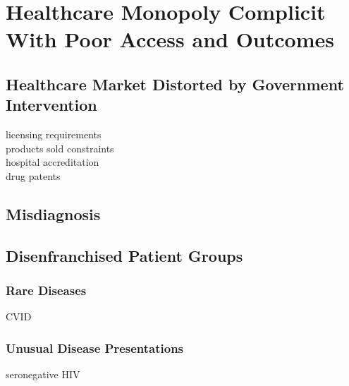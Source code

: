 \documentclass{article}
\begin{document}


\section{Healthcare Monopoly Complicit With Poor Access and Outcomes}

\subsection{Healthcare Market Distorted by Government Intervention}

licensing requirements\\
products sold constraints\\
hospital accreditation\\
drug patents

\subsection{Misdiagnosis}
\cite{singh2014frequency}

\subsection{Disenfranchised Patient Groups}

\subsubsection{Rare Diseases}

CVID

\subsubsection{Unusual Disease Presentations}

seronegative HIV
\end{document}
